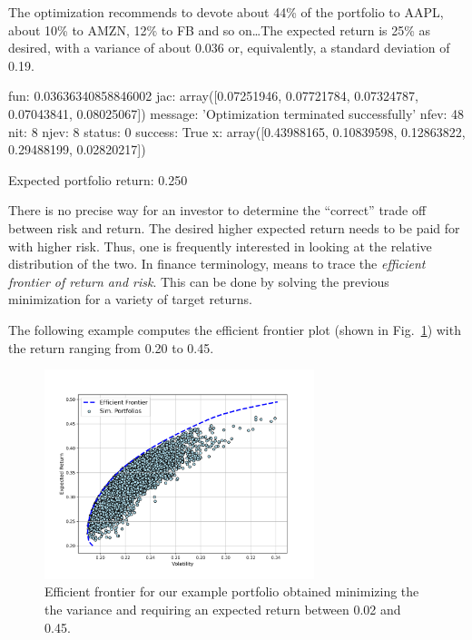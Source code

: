
The optimization recommends to devote about 44\% of the portfolio to AAPL, about 10\% to AMZN, 12\% to FB and so on\ldots The expected return is 25\% as desired, with a variance of about 0.036 or, equivalently, a standard deviation of 0.19.

\begin{ioutput}
     fun: 0.03636340858846002
     jac: array([0.07251946, 0.07721784, 0.07324787, 0.07043841, 0.08025067])
 message: 'Optimization terminated successfully'
    nfev: 48
     nit: 8
    njev: 8
  status: 0
 success: True
       x: array([0.43988165, 0.10839598, 0.12863822, 0.29488199, 0.02820217])
       
Expected portfolio return: 0.250
\end{ioutput}

There is no precise way for an investor to determine the “correct” trade off between risk and return. The desired higher expected return needs to be paid for with higher risk. Thus, one is frequently interested in looking at the relative distribution of the two.
In finance terminology, means to trace the \emph{efficient frontier of return and risk}. This can be done by solving the previous minimization for a variety of target returns.

The following example computes the efficient frontier plot (shown in Fig.~\ref{fig:efficient_frontier}) with the return ranging from 0.20 to 0.45.


\begin{figure}[htb]
\centering
\includegraphics[width=0.7\textwidth]{figures/efficient_frontier}
\caption{Efficient frontier for our example portfolio obtained minimizing the the variance and requiring an expected return between 0.02 and 0.45.}
\label{fig:efficient_frontier}
\end{figure}

